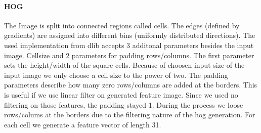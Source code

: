 \documentclass[a4paper,10pt]{article}
\begin{document}
\paragraph{HOG} 
The Image is split into connected regions called cells. The edges (defined by gradients) are assigned into different bins (uniformly distributed directions).
The used implementation from dlib accepts 3 additonal parameters besides the input image.
Cellsize and 2 parameters for padding rows/columns. The first parameter sets the height/width of the square cells. 
Because of choosen input size of the input image we only choose a cell size to the power of two.
The padding parameters describe how many zero rows/columns are added at the borders. This is useful if we use linear filter on generated feature image.
Since we used no filtering on those features, the padding stayed 1. During the process we loose rows/colums at the borders due to the filtering nature of the hog generation.
For each cell we generate a feature vector of length 31.
\end{document}
